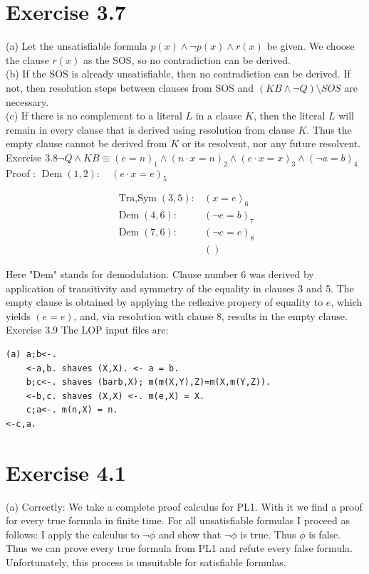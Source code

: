 \documentclass[10pt]{book}
\begin{document}
\section{Exercise 3.7}
(a) Let the unsatisfiable formula $p(x) \wedge \neg p(x) \wedge r(x)$ be given. We choose the clause $r(x)$ as the SOS, so no contradiction can be derived.\\
(b) If the SOS is already unsatisfiable, then no contradiction can be derived. If not, then resolution steps between clauses from SOS and $(KB \wedge \neg Q)\setminus SOS$ are necessary.\\
(c) If there is no complement to a literal $L$ in a clause $K$, then the literal $L$ will remain in every clause that is derived using resolution from clause $K$. Thus the empty clause cannot be derived from $K$ or its resolvent, nor any future resolvent.
Exercise $3.8 \neg Q \wedge K B \equiv(e=n)_{1} \wedge(n \cdot x=n)_{2} \wedge(e \cdot x=x)_{3} \wedge(\neg a=b)_{4}$\\
Proof : $\operatorname{Dem}(1,2): \quad(e \cdot x=e)_{5}$

$$
\begin{array}{ll}
\operatorname{Tra,Sym}(3,5): & (x=e)_{6} \\
\operatorname{Dem}(4,6): & (\neg e=b)_{7} \\
\operatorname{Dem}(7,6): & (\neg e=e)_{8} \\
& ()
\end{array}
$$

Here "Dem" stands for demodulation. Clause number 6 was derived by application of transitivity and symmetry of the equality in clauses 3 and 5. The empty clause is obtained by applying the reflexive propery of equality to $e$, which yields $(e=e)$, and, via resolution with clause 8, results in the empty clause.\\
Exercise 3.9 The LOP input files are:

\begin{verbatim}
(a) a;b<-.
    <-a,b. shaves (X,X). <- a = b.
    b;c<-. shaves (barb,X); m(m(X,Y),Z)=m(X,m(Y,Z)).
    <-b,c. shaves (X,X) <-. m(e,X) = X.
    c;a<-. m(n,X) = n.
<-c,a.
\end{verbatim}

\section{Exercise 4.1}
(a) Correctly: We take a complete proof calculus for PL1. With it we find a proof for every true formula in finite time. For all unsatisfiable formulas I proceed as follows: I apply the calculus to $\neg \phi$ and show that $\neg \phi$ is true. Thus $\phi$ is false. Thus we can prove every true formula from PL1 and refute every false formula. Unfortunately, this process is unsuitable for satisfiable formulas.
\end{document}
